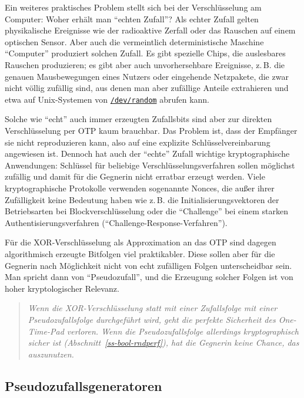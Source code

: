 \begin{refsegment}
Ein weiteres praktisches Problem stellt sich bei der Verschlüsselung
am Computer: Woher erhält man "`echten Zufall"'? Als echter Zufall
gelten physikalische Ereignisse wie der radioaktive Zerfall oder
das Rauschen auf einem optischen Sensor. Aber auch die vermeintlich
deterministische Maschine "`Computer"' produziert solchen Zufall.
Es gibt spezielle Chips, die auslesbares Rauschen produzieren; es
gibt aber auch unvorhersehbare Ereignisse, z.\,B. die genauen Mausbewegungen
eines Nutzers oder eingehende Netzpakete, die zwar nicht völlig
zufällig sind, aus denen man aber zufällige
Anteile extrahieren und etwa auf Unix-Systemen von
\href{http://de.wikipedia.org/wiki//dev/random}{\tt /dev/random}
abrufen kann.

Solche wie "`echt"' auch immer erzeugten Zufallsbits
sind aber zur direkten Verschlüsselung per OTP
kaum brauchbar. Das Problem ist,
dass der Empfänger sie nicht reproduzieren kann, also auf eine
explizite Schlüsselvereinbarung angewiesen ist. Dennoch hat auch
der "`echte"' Zufall wichtige kryptographische Anwendungen:
Schlüssel für beliebige Verschlüsselungsverfahren sollen möglichst
zufällig und damit für die Gegnerin nicht erratbar erzeugt werden.
Viele kryptographische Protokolle verwenden sogenannte Nonces,
die außer ihrer Zufälligkeit keine Bedeutung haben wie z.\,B. die
Initialisierungsvektoren der Betriebsarten bei Blockverschlüsselung
oder die "`Challenge"' bei einem starken Authentisierungsverfahren
("`Challenge-Response-Verfahren"').

Für die XOR-Verschlüsselung als Approximation an das OTP sind dagegen
algorithmisch erzeugte Bitfolgen viel praktikabler. Diese sollen
aber für die Gegnerin nach Möglichkeit nicht von echt zufälligen
Folgen unterscheidbar sein. Man spricht dann von "`Pseudozufall"',
und die Erzeugung solcher Folgen ist von hoher kryptologischer
Relevanz.

\begin{quote}
   {\em Wenn die XOR-Verschlüsselung
   statt mit einer Zufallsfolge mit einer Pseudozufallsfolge
   durchgeführt wird, geht die perfekte Sicherheit des One-Time-Pad
   verloren. Wenn die Pseudozufallsfolge allerdings kryptographisch sicher ist
   (Abschnitt~\ref{ss-bool-rndperf}), hat die Gegnerin keine Chance, das auszunutzen.}
\end{quote}

\subsection{Pseudozufallsgeneratoren}\label{ss-bool-prg}


\end{refsegment}
